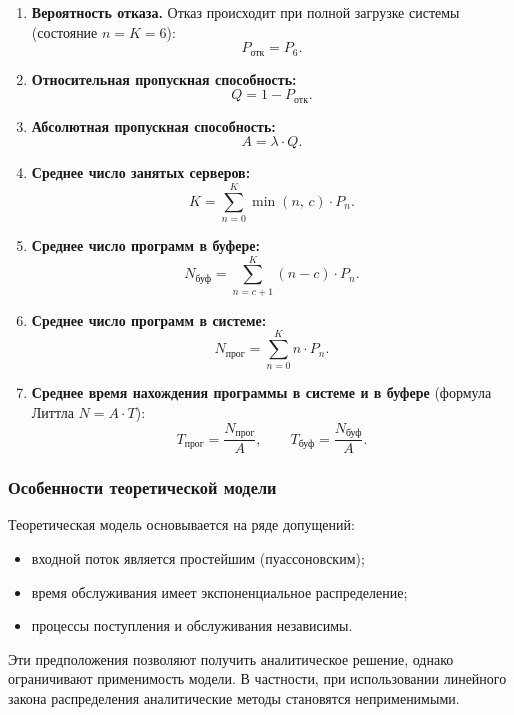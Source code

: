 \documentclass[14pt,a4paper]{extarticle}
\begin{document}
\begin{enumerate}
  \item \textbf{Вероятность отказа.} Отказ происходит при полной загрузке системы
        (состояние $n = K = 6$):
        \[
          P_{\text{отк}} = P_6.
        \]

  \item \textbf{Относительная пропускная способность:}
        \[
          Q = 1 - P_{\text{отк}}.
        \]

  \item \textbf{Абсолютная пропускная способность:}
        \[
          A = \lambda \cdot Q.
        \]

  \item \textbf{Среднее число занятых серверов:}
        \[
          K = \sum_{n=0}^{K} \min(n,\, c) \cdot P_n.
        \]

  \item \textbf{Среднее число программ в буфере:}
        \[
          N_{\text{буф}} = \sum_{n=c+1}^{K} (n - c) \cdot P_n.
        \]

  \item \textbf{Среднее число программ в системе:}
        \[
          N_{\text{прог}} = \sum_{n=0}^{K} n \cdot P_n.
        \]

  \item \textbf{Среднее время нахождения программы в системе и в буфере}
        (формула Литтла $N = A \cdot T$):
        \[
          T_{\text{прог}} = \frac{N_{\text{прог}}}{A}, \qquad
          T_{\text{буф}}  = \frac{N_{\text{буф}}}{A}.
        \]
\end{enumerate}

\subsubsection*{Особенности теоретической модели}

Теоретическая модель основывается на ряде допущений:
\begin{itemize}
  \item входной поток является простейшим (пуассоновским);
  \item время обслуживания имеет экспоненциальное распределение;
  \item процессы поступления и обслуживания независимы.
\end{itemize}

Эти предположения позволяют получить аналитическое решение, однако ограничивают
применимость модели. В частности, при использовании линейного закона
распределения аналитические методы становятся неприменимыми.
\end{document}
